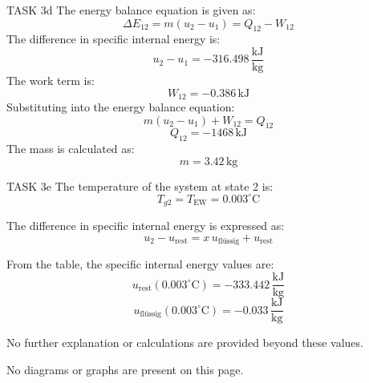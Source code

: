 TASK 3d  
The energy balance equation is given as:  
\[
\Delta E_{12} = m(u_2 - u_1) = Q_{12} - W_{12}
\]  
The difference in specific internal energy is:  
\[
u_2 - u_1 = -316.498 \, \frac{\text{kJ}}{\text{kg}}
\]  
The work term is:  
\[
W_{12} = -0.386 \, \text{kJ}
\]  
Substituting into the energy balance equation:  
\[
m(u_2 - u_1) + W_{12} = Q_{12}
\]  
\[
Q_{12} = -1468 \, \text{kJ}
\]  
The mass is calculated as:  
\[
m = 3.42 \, \text{kg}
\]  

TASK 3e  
The temperature of the system at state 2 is:  
\[
T_{g2} = T_{\text{EW}} = 0.003^\circ \text{C}
\]  

The difference in specific internal energy is expressed as:  
\[
u_2 - u_{\text{rest}} = x \, u_{\text{flüssig}} + u_{\text{rest}}
\]  

From the table, the specific internal energy values are:  
\[
u_{\text{rest}}(0.003^\circ \text{C}) = -333.442 \, \frac{\text{kJ}}{\text{kg}}
\]  
\[
u_{\text{flüssig}}(0.003^\circ \text{C}) = -0.033 \, \frac{\text{kJ}}{\text{kg}}
\]  

No further explanation or calculations are provided beyond these values.  

No diagrams or graphs are present on this page.